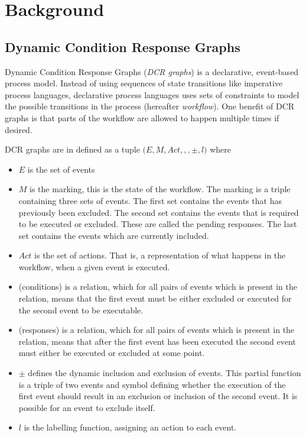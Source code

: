 \chapter{Background}\label{chap:background}
	\section{Dynamic Condition Response Graphs}\label{sec:background:dcrgraphs}
	Dynamic Condition Response Graphs (\textit{DCR graphs}) is a declarative, event-based process model. Instead of using sequences of state transitions like imperative process languages, declarative process languages uses sets of constraints to model the possible transitions in the process (hereafter \textit{workflow}). One benefit of DCR graphs is that parts of the workflow are allowed to happen multiple times if desired.
	
	
	\newpar DCR graphs are in \cite{hildebrandt2011declarative} defined as a tuple $(E, M, Act, $\condition$, $\response$, \pm, l)$ where
	\begin{itemize}
		\item $E$ is the set of events
		\item $M$ is the marking, this is the state of the workflow. The marking is a triple containing three sets of events. The first set contains the events that has previously been excluded. The second set contains the events that is required to be executed or excluded. These are called the pending responses. The last set contains the events which are currently included.
		\item $Act$ is the set of actions. That is, a representation of what happens in the workflow, when a given event is executed.
		\item \condition (conditions) is a relation, which for all pairs of events which is present in the relation, means that the first event must be either excluded or executed for the second event to be executable.
		\item \response (responses) is a relation, which for all pairs of events which is present in the relation, means that after the first event has been executed the second event must either be executed or excluded at some point.
		\item $\pm$ defines the dynamic inclusion and exclusion of events. This partial function is a triple of two events and symbol defining whether the execution of the first event should result in an exclusion or inclusion of the second event. It is possible for an event to exclude itself.
		\item $l$ is the labelling function, assigning an action to each event.
	\end{itemize}
		
